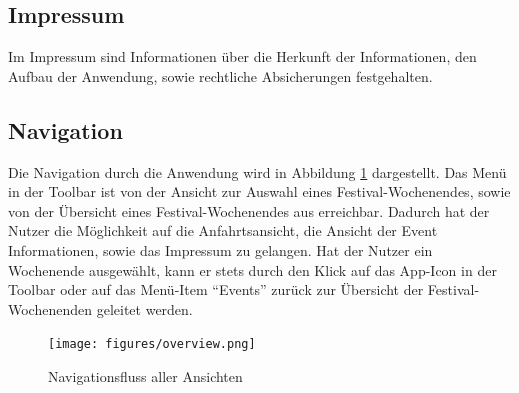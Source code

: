 \subsection{Impressum}
Im Impressum sind Informationen über die Herkunft der Informationen, den Aufbau der Anwendung, sowie rechtliche Absicherungen festgehalten.


\subsection{Navigation}
\label{sec:navigation}
Die Navigation durch die Anwendung wird in Abbildung \ref{fig:overview} dargestellt. Das Menü in der Toolbar ist von der Ansicht zur Auswahl eines Festival-Wochenendes, sowie von der Übersicht eines Festival-Wochenendes aus erreichbar. Dadurch hat der Nutzer die Möglichkeit auf die Anfahrtsansicht, die Ansicht der Event Informationen, sowie das Impressum zu gelangen. Hat der Nutzer ein Wochenende ausgewählt, kann er stets durch den Klick auf das App-Icon in der Toolbar oder auf das Menü-Item "`Events"' zurück zur Übersicht der Festival-Wochenenden geleitet werden. 

\begin{figure}[p]
    \centering
        \texttt{[image: figures/overview.png]}
    \caption{Navigationsfluss aller Ansichten}
    \label{fig:overview}
\end{figure}